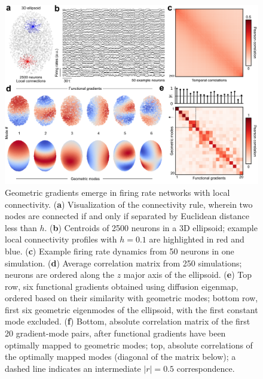\documentclass{article}
\begin{document}
\begin{figure}[t]
    \centering
    \includegraphics[width=1.0\linewidth]{figures/figure1.png}
    \caption{Geometric gradients emerge in firing rate networks with local connectivity. (\textbf{a}) Visualization of the connectivity rule, wherein two nodes are connected if and only if separated by Euclidean distance less than $h$. (\textbf{b}) Centroids of 2500 neurons in a 3D ellipsoid; example local connectivity profiles with $h=0.1$ are highlighted in red and blue. (\textbf{c}) Example firing rate dynamics from 50 neurons in one simulation. (\textbf{d}) Average correlation matrix from 250 simulations; neurons are ordered along the $z$ major axis of the ellipsoid. (\textbf{e}) Top row, six functional gradients obtained using diffusion eigenmap, ordered based on their similarity with geometric modes; bottom row, first six geometric eigenmodes of the ellipsoid, with the first constant mode excluded. (\textbf{f}) Bottom, absolute correlation matrix of the first 20 gradient-mode pairs, after functional gradients have been optimally mapped to geometric modes; top, absolute correlations of the optimally mapped modes (diagonal of the matrix below); a dashed line indicates an intermediate $|r|=0.5$ correspondence.}
    \label{fig1}
    \hrulefill
\end{figure}
\end{document}
